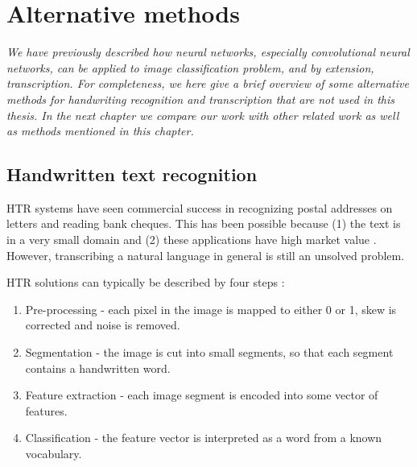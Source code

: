 
\chapter{Alternative methods}
\textit{ We have previously described how neural networks, especially convolutional neural networks, can be applied to image classification problem, and by extension, transcription.
For completeness, we here give a brief overview of some alternative methods for handwriting recognition and transcription that are not used in this thesis.
In the next chapter we compare our work with other related work as well as methods mentioned in this chapter.
}



\section{Handwritten text recognition}

HTR systems have
seen commercial success in
recognizing postal addresses on letters \cite{lecun_1989, zipcode_system} and reading bank cheques. This has been possible because (1) the text is in a very small domain and (2) these applications have high market value \cite{40_years_HWR}. However, transcribing a natural language in general is still an unsolved problem.

HTR solutions can typically be described by four steps \cite{offline_HWR_CNN}:
\begin{enumerate}
    \item Pre-processing - each pixel in the image is mapped to either 0 or 1, skew is corrected and noise is removed.
    \item Segmentation - the image is cut into small segments, so that each segment contains a handwritten word.
    \item Feature extraction - each image segment is encoded into some vector of features.
    \item Classification - the feature vector is interpreted as a word from a known vocabulary.
\end{enumerate}

